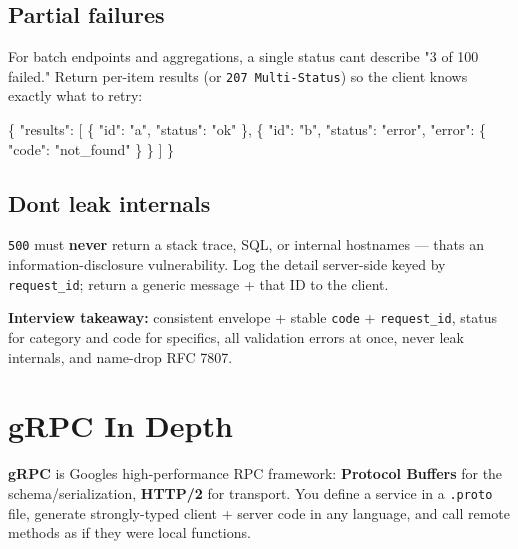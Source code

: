 \documentclass[11pt]{article}
\newenvironment{Shaded}{\begin{snugshade}}{\end{snugshade}}
\newcommand{\DataTypeTok}[1]{\textcolor[rgb]{0.16,0.50,0.73}{#1}}
\newcommand{\FunctionTok}[1]{\textcolor[rgb]{0.56,0.27,0.68}{#1}}
\newcommand{\OtherTok}[1]{\textcolor[rgb]{0.15,0.68,0.38}{#1}}
\newcommand{\StringTok}[1]{\textcolor[rgb]{0.96,0.31,0.31}{#1}}
\begin{document}
\subsection{Partial failures}\label{partial-failures}

For batch endpoints and aggregations, a single status can\textquotesingle t describe "3 of 100 failed." Return per-item results (or \texttt{207\ Multi-Status}) so the client knows exactly what to retry:


\begin{Shaded}
\begin{Highlighting}[]
\FunctionTok{\{}
  \DataTypeTok{"results"}\FunctionTok{:} \OtherTok{[}
    \FunctionTok{\{} \DataTypeTok{"id"}\FunctionTok{:} \StringTok{"a"}\FunctionTok{,} \DataTypeTok{"status"}\FunctionTok{:} \StringTok{"ok"} \FunctionTok{\}}\OtherTok{,}
    \FunctionTok{\{} \DataTypeTok{"id"}\FunctionTok{:} \StringTok{"b"}\FunctionTok{,} \DataTypeTok{"status"}\FunctionTok{:} \StringTok{"error"}\FunctionTok{,} \DataTypeTok{"error"}\FunctionTok{:} \FunctionTok{\{} \DataTypeTok{"code"}\FunctionTok{:} \StringTok{"not\_found"} \FunctionTok{\}} \FunctionTok{\}}
  \OtherTok{]}
\FunctionTok{\}}
\end{Highlighting}
\end{Shaded}

\subsection{Don\textquotesingle t leak internals}\label{dont-leak-internals}

\texttt{500} must \textbf{never} return a stack trace, SQL, or internal hostnames --- that\textquotesingle s an information-disclosure vulnerability. Log the detail server-side keyed by \texttt{request\_id}; return a generic message + that ID to the client.

\textbf{Interview takeaway:} consistent envelope + stable \texttt{code} + \texttt{request\_id}, status for category and code for specifics, all validation errors at once, never leak internals, and name-drop RFC 7807.

\section{gRPC In Depth}\label{grpc-in-depth}

\textbf{gRPC} is Google\textquotesingle s high-performance RPC framework: \textbf{Protocol Buffers} for the schema/serialization, \textbf{HTTP/2} for transport. You define a service in a \texttt{.proto} file, generate strongly-typed client + server code in any language, and call remote methods as if they were local functions.
\end{document}
